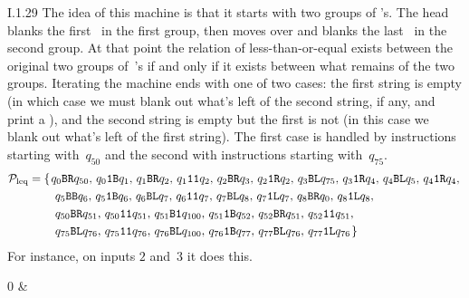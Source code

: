 %
\begin{ans}{I.1.29}
The idea of this machine is that it starts with two
groups of 's.
The head blanks the first~ in the first group, then moves over
and blanks the last~ in the second group.
At that point the relation of less-than-or-equal exists between the original
two groups of~'s if and only if it exists between what remains of the
two groups.
Iterating the machine ends with one of two cases: the first string is empty
(in which case we must blank out what's left of the second string, if any, and
print a ), and
the second string is empty but the first is not (in this case we blank out
what's left of the first string).
The first case is handled by instructions starting with~$q_{50}$ and the
second with instructions starting with~$q_{75}$.
\begin{align*}
  \mathcal{P}_{\text{leq}}
  &=
  \{\hspace{0.1em}
     q_{0}\texttt{B}\texttt{R}q_{50},\,
     q_{0}\texttt{1}\texttt{B}q_{1},\,
     q_{1}\texttt{B}\texttt{R}q_{2},\,
     q_{1}\texttt{1}\texttt{1}q_{2},\,
     q_{2}\texttt{B}\texttt{R}q_{3},\,
     q_{2}\texttt{1}\texttt{R}q_{2},\,
     q_{3}\texttt{B}\texttt{L}q_{75},\,
     q_{3}\texttt{1}\texttt{R}q_{4},\,
     q_{4}\texttt{B}\texttt{L}q_{5},\,
     q_{4}\texttt{1}\texttt{R}q_{4},\,
     \\ &\qquad\;
     q_{5}\texttt{B}\texttt{B}q_{6},\,
     q_{5}\texttt{1}\texttt{B}q_{6},\,
     q_{6}\texttt{B}\texttt{L}q_{7},\,
     q_{6}\texttt{1}\texttt{1}q_{7},\,
     q_{7}\texttt{B}\texttt{L}q_{8},\,
     q_{7}\texttt{1}\texttt{L}q_{7},\,
     q_{8}\texttt{B}\texttt{R}q_{0},\,
     q_{8}\texttt{1}\texttt{L}q_{8},\,
     \\ &\qquad\;
     q_{50}\texttt{B}\texttt{R}q_{51},\,
     q_{50}\texttt{1}\texttt{1}q_{51},\,
     q_{51}\texttt{B}\texttt{1}q_{100},\,
     q_{51}\texttt{1}\texttt{B}q_{52},\,
     q_{52}\texttt{B}\texttt{R}q_{51},\,
     q_{52}\texttt{1}\texttt{1}q_{51},\,
     \\ &\qquad\;
     q_{75}\texttt{B}\texttt{L}q_{76},\,
     q_{75}\texttt{1}\texttt{1}q_{76},\,
     q_{76}\texttt{B}\texttt{L}q_{100},\,
     q_{76}\texttt{1}\texttt{B}q_{77},\,
     q_{77}\texttt{B}\texttt{L}q_{76},\,
     q_{77}\texttt{1}\texttt{L}q_{76}
  \hspace{0.1em}\}
\end{align*}
For instance, on inputs $2$ and~$3$ it does this.
\begin{tapesequence}
  \begin{tapesequencetable}
    0 & \\

\end{tapesequencetable}
\end{tapesequence}
\end{ans}
